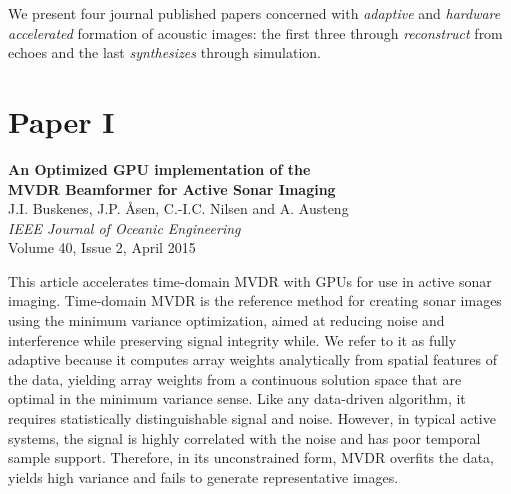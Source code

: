%
% 


We present four journal published papers concerned with \emph{adaptive} and \emph{hardware accelerated} formation of acoustic images: the first three through \emph{reconstruct} from echoes and the last \emph{synthesizes} through simulation. 

%
%


%

\section{Paper I}\label{sec:paperI} %
\textbf{An Optimized GPU implementation of the\\
MVDR Beamformer for Active Sonar Imaging}\\
J.I. Buskenes, J.P. Åsen, C.-I.C. Nilsen and A. Austeng\\
\textit{IEEE Journal of Oceanic Engineering}\\
Volume 40, Issue 2, April 2015

This article accelerates time-domain MVDR with GPUs for use in active sonar imaging. Time-domain MVDR is the reference method for creating sonar images using the minimum variance optimization, aimed at reducing noise and interference while preserving signal integrity while. We refer to it as fully adaptive because it computes array weights analytically from spatial features of the data, yielding array weights from a continuous solution space that are optimal in the minimum variance sense. Like any data-driven algorithm, it requires statistically distinguishable signal and noise. However, in typical active systems, the signal is highly correlated with the noise and has poor temporal sample support. Therefore, in its unconstrained form, MVDR overfits the data, yields high variance and fails to generate representative images.

